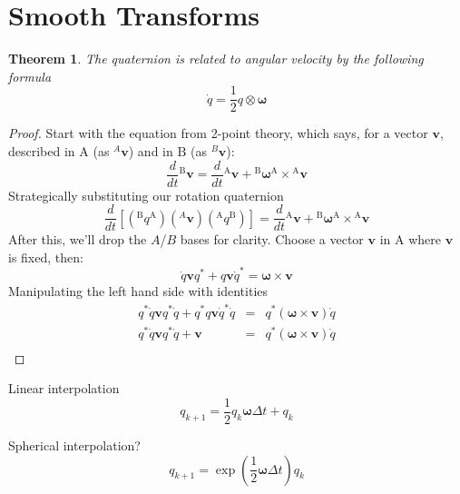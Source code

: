 \documentclass{amsart}
\newtheorem{theorem}{Theorem}[section]
\theoremstyle{definition}
\theoremstyle{remark}
\numberwithin{equation}{section}
\begin{document}
\section{Smooth Transforms}
\begin{theorem}
  The quaternion is related to angular velocity by the following formula
  \begin{equation}
    \dot{q} = \frac{1}{2} q \otimes \boldsymbol\omega
  \end{equation}
\end{theorem}
\begin{proof}
  Start with the equation from 2-point theory, which says, for a vector $\mathbf{v}$, described in $\mathrm{A}$ (as ${^A\mathbf{v}}$) and in $\mathrm{B}$ (as ${^B\mathbf{v}}$):
  \begin{equation}
    \frac{d}{dt} {^\mathrm{B}\mathbf{v}} = \frac{d}{dt} {^\mathrm{A}\mathbf{v}} + {^\mathrm{B}\boldsymbol\omega^\mathrm{A}} \times {^\mathrm{A}\mathbf{v}}
  \end{equation}
  Strategically substituting our rotation quaternion
  \begin{equation}
    \frac{d}{dt} \left[\left({^\mathrm{B}q^\mathrm{A}}\right)\left({^A\mathbf{v}}\right)\left({^\mathrm{A}q^\mathrm{B}}\right) \right]  = \frac{d}{dt} {^\mathrm{A}\mathbf{v}} + {^\mathrm{B}\boldsymbol\omega^\mathrm{A}}\times {^\mathrm{A}\mathbf{v}}
  \end{equation}
  After this, we'll drop the $A$/$B$ bases for clarity. Choose a vector $\mathbf{v}$ in $\mathrm{A}$ where $\mathbf{v}$ is fixed, then:
  \begin{equation}
    \dot{q}\mathbf{v}q^*+q\mathbf{v}\dot{q}^* = \boldsymbol\omega\times \mathbf{v}
  \end{equation}
  Manipulating the left hand side with identities
  \begin{eqnarray}
    q^*\dot{q}\mathbf{v}q^*\dot{q}+q^*q\mathbf{v}\dot{q}^*\dot{q} &=& q^*\left(\boldsymbol\omega\times\mathbf{v}\right)\dot{q}\nonumber \\
    q^*\dot{q}\mathbf{v}q^*\dot{q}+\mathbf{v} &=& q^*\left(\boldsymbol\omega\times\mathbf{v}\right)\dot{q}\nonumber \\
  \end{eqnarray}
\end{proof}

Linear interpolation
\begin{equation}
  q_{k+1} = \frac{1}{2}q_k\boldsymbol\omega\Delta t + q_k 
\end{equation}

Spherical interpolation?
\begin{equation}
  q_{k+1} = \exp\left(\frac{1}{2} \boldsymbol\omega\Delta t\right)q_k
\end{equation}
\end{document}
